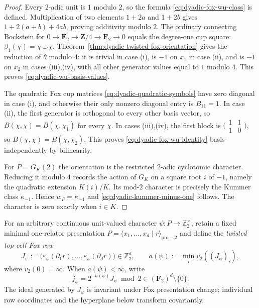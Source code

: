 \documentclass[11pt]{article}
\theoremstyle{definition}
\begin{document}
\begin{proof}
Every $2$-adic unit is $1$ modulo $2$, so the formula
\eqref{eq:dyadic-fox-wu-class} is defined.  Multiplication
of two elements $1+2a$ and $1+2b$ gives
$1+2(a+b)+4ab$, proving additivity modulo $2$.
The ordinary connecting Bockstein for
$0\to\mathbf F_2\to\mathbf Z/4\to\mathbf F_2\to0$
equals the degree-one cup square:
$\beta_1(\chi)=\chi\smile\chi$.
Theorem~\ref{thm:dyadic-twisted-fox-orientation}
gives the reduction of $\theta$ modulo $4$:
it is trivial in case (i), is $-1$ on $x_1$ in
case (ii), and is $-1$ on $x_2$ in
cases (iii),(iv), with all other generator values
equal to $1$ modulo $4$.
This proves \eqref{eq:dyadic-wu-basis-values}.

The quadratic Fox cup matrices
\eqref{eq:dyadic-quadratic-symbols}
have zero diagonal in case (i), and otherwise
their only nonzero diagonal entry is $B_{11}=1$.
In case (ii), the first generator is orthogonal
to every other basis vector, so
$B(\chi,\chi)=B(\chi,\chi_1)$ for every $\chi$.
In cases (iii),(iv), the first block is
$\bigl(\begin{smallmatrix}1&1\\1&0\end{smallmatrix}\bigr)$,
so $B(\chi,\chi)=B(\chi,\chi_2)$.
This proves \eqref{eq:dyadic-fox-wu-identity}
basis-independently by bilinearity.

For $P=G_K(2)$ the orientation is the restricted
$2$-adic cyclotomic character.  Reducing it modulo
$4$ records the action of $G_K$ on a square root
$i$ of $-1$, namely the quadratic extension
$K(i)/K$.  Its mod-$2$ character is precisely
the Kummer class $\kappa_{-1}$.  Hence
$w_P=\kappa_{-1}$ and
\eqref{eq:dyadic-kummer-minus-one} follows.
The character is zero exactly when $i\in K$.
\end{proof}

For an arbitrary continuous unit-valued character
$\psi:P\to\mathbb Z_2^\times$, retain a fixed
minimal one-relator presentation
$P=\langle x_1,\ldots,x_d\mid r\rangle_{\mathrm{pro}-2}$
and define the \emph{twisted top-cell Fox row}
\begin{equation}\label{eq:dyadic-psi-fox-row}
J_\psi:=
\bigl(\varepsilon_\psi(\partial_1r),\ldots,
\varepsilon_\psi(\partial_dr)\bigr)\in\mathbb Z_2^d,
\qquad
a(\psi):=\min_i v_2((J_\psi)_i),
\end{equation}
where $v_2(0)=\infty$.  When $a(\psi)<\infty$,
write
\begin{equation}\label{eq:dyadic-psi-leading-row}
j_\psi=
2^{-a(\psi)}J_\psi\bmod2
\in(\mathbf F_2)^d\setminus\{0\}.
\end{equation}
The ideal generated by $J_\psi$ is invariant under
Fox presentation change; individual row coordinates
and the hyperplane below transform covariantly.
\end{document}
